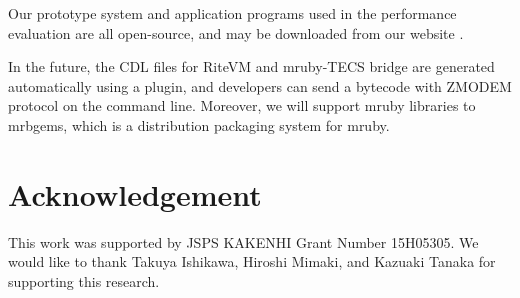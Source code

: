 \documentclass{sig-alternate-05-2015}
\begin{document}
Our prototype system and application programs used in the performance evaluation are all open-source, and may be downloaded from our website \cite{url:download}.

In the future, the CDL files for RiteVM and mruby-TECS bridge are generated automatically using a plugin, and developers can send a bytecode with ZMODEM protocol on the command line.
Moreover, we will support mruby libraries to mrbgems, which is a distribution packaging system for mruby.

\section{Acknowledgement}
This work was supported by JSPS KAKENHI Grant Number 15H05305.
We would like to thank Takuya Ishikawa, Hiroshi Mimaki, and Kazuaki Tanaka for supporting this research.


\end{document}

